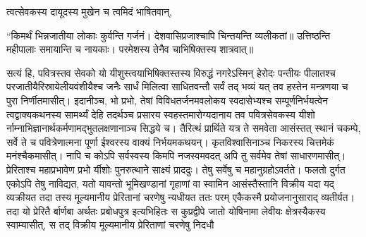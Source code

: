 \vakya त्वत्सेवकस्य दायूदस्य मुखेन च त्वमिदं भाषितवान्,
\begin{poem}
\startwithline “किमर्थं भिन्नजातीया लोकाः कुर्वन्ति गर्जनं।
\pline देशवासिप्रजाश्चापि चिन्तयन्ति व्यलीकतां॥
\vakya उत्तिष्ठन्ति महीपालाः समायान्ति च नायकाः।
\pline परमेशस्य तेनैव चाभिषिक्तस्य शात्रवात्॥
\end{poem}
\vakya सत्यं हि, पवित्रस्तव सेवको यो यीशुस्त्वयाभिषिक्तस्तस्य विरुद्धं नगरेऽस्मिन् हेरोदः पन्तीयः पीलातश्च परजातीयैरिस्रायेलीयवंशीयैश्च
\vakya जनैः सार्धं मिलित्वा साधितवन्तौ सर्वं तद् भव्यं यत् तव हस्तेन मन्त्रणया च पुरा निर्णीतमासीत्।
\vakya इदानीञ्च, भो प्रभो, तेषां विविधतर्जनमवलोकय
\vakya स्वदासेभ्यश्च सम्पूर्णनिर्भयत्वेन त्वद्वाक्यकथनस्य सामर्थ्यं देहि तदर्थञ्च प्रसारय स्वहस्तमारोग्यदानाय तव पवित्रसेवकस्य यीशो र्नाम्नाभिज्ञानार्थकर्मणामद्भुतलक्षणानाञ्च सिद्धये च।
\vakya तैरित्थं प्रार्थिते यत्र ते समवेता आसंस्तत् स्थानं चकम्पे, सर्वे ते च पवित्रेणात्मना पूर्णा ईश्वरस्य वाक्यं निर्भयमकथयन्।
\vakya कृतविश्वासिनाञ्च निकरस्य चित्तमेकं मनंश्चैकमासीत्। नापि च कोऽपि सर्वस्वस्य किमपि नजस्वमवदत् अपि तु सर्वमेव तेषां साधारणमासीत्। प्रेरिताश्च महाप्रभावेण प्रभो र्यीशोः पुनरुत्थाने साक्ष्यं प्राददुः।
\vakya तेषु सर्वेषु च महानुग्रहोऽवर्तते।
\vakya फलतो दुर्गत एकोऽपि तेषु नाविद्यत, यतो यावन्तो भूमिखण्डानां गृहाणां वा स्वामिन आसंस्तैस्तानि विक्रीय यदा यद् व्यक्रीयत तदा तस्य मूल्यमानीय प्रेरितानां चरणेषु न्यधीयत ततः परम् एकैकस्मै प्रयोजनानुसाराद् व्यतीर्यत।
\vakya तदा यो प्रेरितै र्बार्णबा अर्थतः प्रबोधपुत्र इत्यभिहितः स कुप्रद्वीपे जातो योषिनामा लेवीयः क्षेत्रस्यैकस्य स्वाम्यासीत्, स तद् विक्रीय मूल्यमानीय प्रेरिताणां चरणेषु निदधौ\eoc